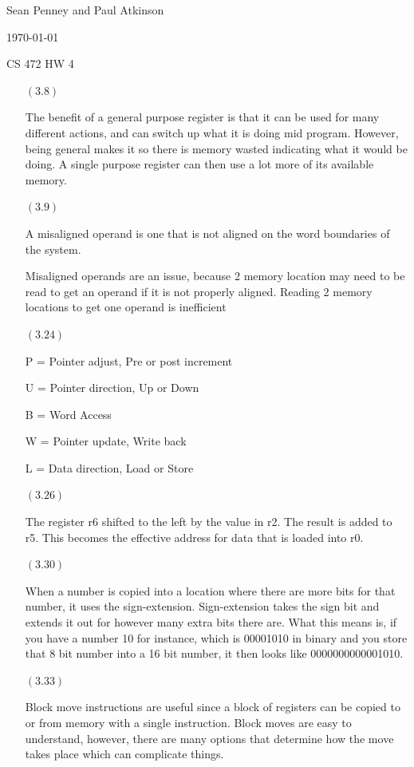 \documentclass[letterpaper,10pt,titlepage]{article}
\def\name{Sean Penney and Paul Atkinson}
\begin{document}
\hfill \name

\hfill \today

\hfill CS 472 HW 4

\begin{enumerate}

\item[$(3.8)$]

  The benefit of a general purpose register is that it can be used for many different actions, and can switch up what it is doing mid program.
  However, being general makes it so there is memory wasted indicating what it would be doing. A single purpose register can then use a lot more
  of its available memory.

\item[$(3.9)$] 

  A misaligned operand is one that is not aligned on the word boundaries of the system.
  
  Misaligned operands are an issue, because 2 memory location may need to be read to get an operand if it is not properly aligned.
  Reading 2 memory locations to get one operand is inefficient

\item[$(3.24)$]

  P = Pointer adjust, Pre or post increment
  
  U = Pointer direction, Up or Down

  B = Word Access

  W = Pointer update, Write back

  L = Data direction, Load or Store

\item[$(3.26)$] 

  The register r6 shifted to the left by the value in r2.  The result is added to r5.  This becomes the effective address for data that is loaded into r0.
  
\item[$(3.30)$]

  When a number is copied into a location where there are more bits for that number, it uses the sign-extension. Sign-extension takes the 
  sign bit and extends it out for however many extra bits there are. What this means is, if you have a number 10 for instance, which is 00001010 
  in binary and you store that 8 bit number into a 16 bit number, it then looks like 0000000000001010.

\item[$(3.33)$] 

  Block move instructions are useful since a block of registers can be copied to or from memory with a single instruction.
  Block moves are easy to understand, however, there are many options that determine how the move takes place which can complicate things.


\end{enumerate}
\end{document}
